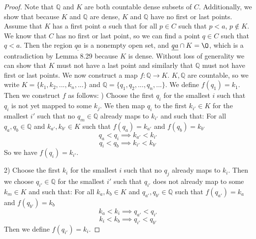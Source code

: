 \documentclass[12pt]{article}
\newcommand{\bbQ}{\mathbb{Q}}
\renewcommand{\emptyset}{\O}
\renewcommand{\_}[1]{\underline{ #1 }}
\theoremstyle{definition}
\numberwithin{equation}{subsection}
\begin{document}
\begin{proof}
Note that $\bbQ$ and $K$ are both countable dense subsets of $C$. Additionally, we show that because $K$ and $\bbQ$ are dense, $K$ and $\bbQ$ have no first or last points. \newline
Assume that $K$ has a first point $a$ such that for all $p \in C$ such that $p < a$, $p \not \in K$. We know that $C$ has no first or last point, so we can find a point $q \in C$ such that $q < a$. Then the region $\_{qa}$ is a nonempty open set, and $\_{qa} \cap K = \emptyset$, which is a contradiction by Lemma 8.29 because $K$ is dense. Without loss of generality we can show that $K$ must not have a last point and similarly that $\bbQ$ must not have first or last points. \newline
We now construct a map $f : \bbQ \longrightarrow K$. $K, \bbQ$ are countable, so we write $K = \{k_1,k_2,...,k_n,...\}$ and $\bbQ = \{q_1,q_2,...,q_n,...\}$. We define $f(q_1) = k_1$. Then we construct $f$ as follows: ) Choose the first $q_i$ for the smallest $i$ such that $q_i$ is not yet mapped to some $k_j$. We then map $q_i$ to the first $k_{i'} \in K$ for the smallest $i'$ such that no $q_m \in \bbQ$ already maps to $k_{i'}$ and such that: \newline
For all $q_a, q_b \in \bbQ$ and $k_{a'}, k_{b'} \in K$ such that $f(q_a) = k_{a'}$ and $f(q_b) = k_{b'}$
$$q_a < q_i \implies k_{a'} < k_{i'}$$ 
$$q_i < q_b \implies k_{i'} < k_{b'}$$
So we have $f(q_i) = k_{i'}$. \newline

2) Choose the first $k_i$ for the smallest $i$ such that no $q_{j}$ already maps to $k_i$. Then we choose $q_{i'} \in \bbQ$ for the smallest $i'$ such that $q_{i'}$ does not already map to some $k_m \in K$ and such that: \newline
For all $k_a, k_b \in K$ and $q_{a'}, q_{b'} \in \bbQ$ such that $f(q_{a'}) = k_a$ and $f(q_{b'}) = k_b$ 
$$k_a < k_i \implies q_{a'} < q_{i'}$$
$$k_i < k_b \implies q_{i'} < q_{b'}$$
Then we define $f(q_{i'}) = k_{i}$. \newline


\end{proof}
\end{document}
